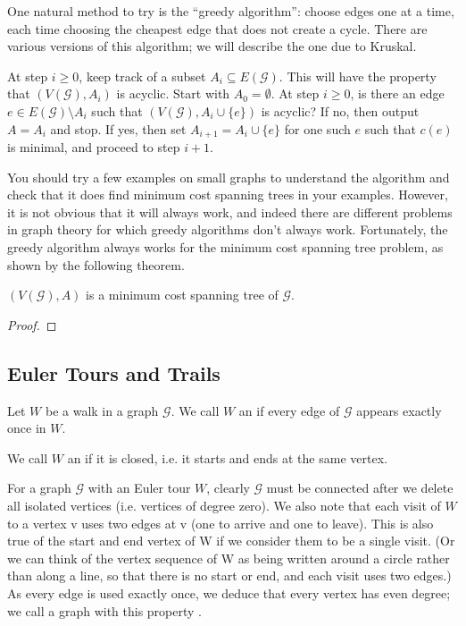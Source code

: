 One natural method to try is the ``greedy algorithm'': choose edges one at a time, each time choosing the cheapest edge that does not create a cycle. There are various versions of this algorithm; we will describe the one due to Kruskal.

\begin{theorem}
At step $i\ge0$, keep track of a subset $A_i\subseteq E(\mathcal{G})$. This will have the property that $(V(\mathcal{G}),A_i)$ is acyclic. Start with $A_0=\emptyset$. At step $i\ge0$, is there an edge $e\in E(\mathcal{G})\setminus A_i$ such that $(V(\mathcal{G}),A_i\cup\{e\})$ is acyclic? If no, then output $A=A_i$ and stop. If yes, then set $A_{i+1}=A_i\cup\{e\}$ for one such $e$ such that $c(e)$ is minimal, and proceed to step $i+1$.
\end{theorem}

You should try a few examples on small graphs to understand the algorithm and check that it does find minimum cost spanning trees in your examples. However, it is not obvious that it will always work, and indeed there are different problems in graph theory for which greedy algorithms don't always work. Fortunately, the greedy algorithm always works for the minimum cost spanning tree problem, as shown by the following theorem.

\begin{theorem}
$(V(\mathcal{G}),A)$ is a minimum cost spanning tree of $\mathcal{G}$.
\end{theorem}

\begin{proof}

\end{proof}

\subsection{Euler Tours and Trails}
\begin{definition}
Let $W$ be a walk in a graph $\mathcal{G}$. We call $W$ an  if every edge of $\mathcal{G}$ appears exactly once in $W$. 

We call $W$ an  if it is closed, i.e. it starts and ends at the same vertex.
\end{definition}

For a graph $\mathcal{G}$ with an Euler tour $W$, clearly $\mathcal{G}$ must be connected after we delete all isolated vertices (i.e. vertices of degree zero). We also note that each visit of $W$ to a vertex v uses two edges at v (one to arrive and one to leave). This is also true of the start and end vertex of W if we consider them to be a single visit. (Or we can think of the vertex sequence of W as being written around a circle rather than along a line, so that there is no start or end, and each visit uses two edges.) As every edge is used exactly once, we deduce that every vertex has even degree; we call a graph with this property .

